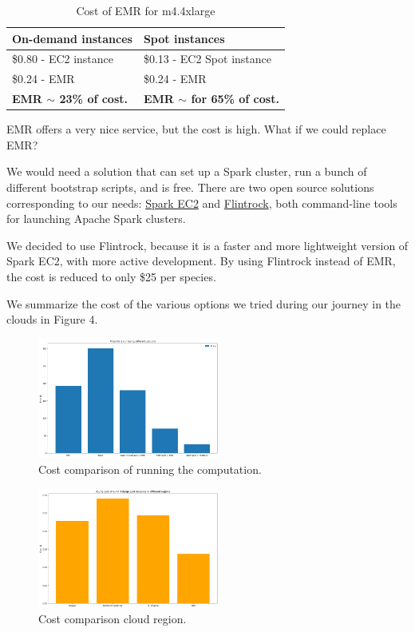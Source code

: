\documentclass{acm_proc_article-sp}
\begin{document}
\begin{table}[h!]
    \centering
    \begin{tabular}{|l|l|}
    On-demand instances & Spot instances\\ \hline
    \$0.80 - EC2 instance          & \$0.13 - EC2 Spot instance\\
    \$0.24 - EMR                   & \$0.24 - EMR\\
    {\bf EMR $\sim$ 23\% of cost.} & {\bf EMR $\sim$ for 65\% of cost.}
    \end{tabular}
    \caption{Cost of EMR for m4.4xlarge}
    \label{table:cost-EMR}
    \end{table}

EMR offers a very nice service, but the cost is high. What if we could replace EMR?

We would need a solution that can set up a Spark cluster, run a bunch of different bootstrap scripts, and is free. There are two open source solutions corresponding to our needs: \href{https://github.com/amplab/spark-ec2}{Spark EC2} and \href{https://github.com/nchammas/flintrock}{Flintrock}, both command-line tools for launching Apache Spark clusters.

We decided to use Flintrock, because it is a faster and more lightweight version of Spark EC2, with more active development. 
By using Flintrock instead of EMR, the cost is reduced to only \$25 per species.

We summarize the cost of the various options we tried during our journey in the clouds in Figure 4.

\begin{figure}[h]
    \centering
    \includegraphics[width=6cm]{IMG/cost-comp-1.png}
    \caption{Cost comparison of running the computation.}
    \label{fig::cost-comp-1}
\end{figure}

\begin{figure}[h]
    \centering
    \includegraphics[width=6cm]{IMG/cost-comp-2.png}
    \caption{Cost comparison cloud region.}
    \label{fig::cost-comp-2}
\end{figure}
\end{document}
